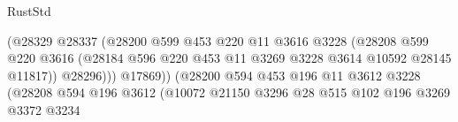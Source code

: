 \begin{lexlean}{RustStd}
\begin{coremodule}
                                                (@28329
                                                  @28337
                                                  (@28200
                                                    @599
                                                    @453
                                                    @220
                                                    @11
                                                    @3616
                                                    @3228
                                                    (@28208
                                                      @599
                                                      @220
                                                      @3616
                                                      (@28184
                                                        @596
                                                        @220
                                                        @453
                                                        @11
                                                        @3269
                                                        @3228
                                                        @3614
                                                        @10592
                                                        @28145
                                                        @11817))
                                                    @28296)))
                                              @17869))
                                          (@28200
                                            @594
                                            @453
                                            @196
                                            @11
                                            @3612
                                            @3228
                                            (@28208
                                              @594
                                              @196
                                              @3612
                                              (@10072
                                                @21150
                                                @3296
                                                @28
                                                @515
                                                @102
                                                @196
                                                @3269
                                                @3372
                                                @3234

\end{coremodule}
\end{lexlean}
